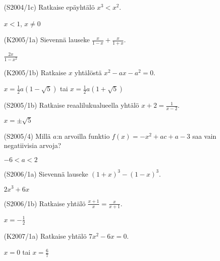 \begin{tehtava}
(S2004/1c) Ratkaise epäyhtälö $x^3<x^2$.
\begin{vastaus}
$x<1$, $x\neq0$ 
\end{vastaus}
\end{tehtava}

\begin{tehtava}
(K2005/1a) Sievennä lauseke $\frac{x}{1-x}+\frac{x}{1+x}$.
\begin{vastaus}
$\frac{2x}{1-x^2}$ 
\end{vastaus}
\end{tehtava}

\begin{tehtava}
(K2005/1b) Ratkaise $x$ yhtälöstä $x^2-ax-a^2=0$.
\begin{vastaus}
$x= \frac{1}{2}a(1-\sqrt{5})$ tai $x= \frac{1}{2}a(1+\sqrt{5})$ 
\end{vastaus}
\end{tehtava}

\begin{tehtava}
(S2005/1b) Ratkaise reaalilukualueella yhtälö $x+2=\frac{1}{x-2}$.
\begin{vastaus}
$x=\pm \sqrt{5}$ 
\end{vastaus}
\end{tehtava}

\begin{tehtava}
(S2005/4) Millä $a$:n arvoilla funktio $f(x)=-x^2+ac+a-3$ saa vain negatiivisia arvoja?
\begin{vastaus}
$-6<a<2$ 
\end{vastaus}
\end{tehtava}

\begin{tehtava}
(S2006/1a) Sievennä lauseke $(1+x)^3-(1-x)^3$.
\begin{vastaus}
$2x^3+6x$ 
\end{vastaus}
\end{tehtava}

\begin{tehtava}
(S2006/1b) Ratkaise yhtälö $ \frac{x+1}{x}=\frac{x}{x+1}$.
\begin{vastaus}
$x=-\frac{1}{2}$ 
\end{vastaus}
\end{tehtava}

\begin{tehtava}
(K2007/1a) Ratkaise yhtälö $7x^2-6x=0$.
\begin{vastaus}
$x=0$ tai $x=\frac{6}{7}$
\end{vastaus}
\end{tehtava}

